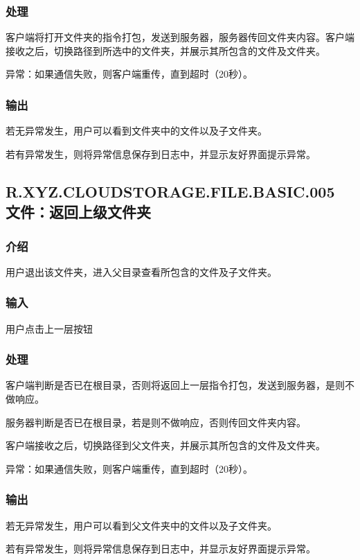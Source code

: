\subsubsection{处理}
客户端将打开文件夹的指令打包，发送到服务器，服务器传回文件夹内容。客户端接收之后，切换路径到所选中的文件夹，并展示其所包含的文件及文件夹。

异常：如果通信失败，则客户端重传，直到超时（20秒）。

\subsubsection{输出}
若无异常发生，用户可以看到文件夹中的文件以及子文件夹。

若有异常发生，则将异常信息保存到日志中，并显示友好界面提示异常。

\subsection{R.XYZ.CLOUDSTORAGE.FILE.BASIC.005 文件：返回上级文件夹}

\subsubsection{介绍}
用户退出该文件夹，进入父目录查看所包含的文件及子文件夹。

\subsubsection{输入}
用户点击上一层按钮

\subsubsection{处理}
客户端判断是否已在根目录，否则将返回上一层指令打包，发送到服务器，是则不做响应。

服务器判断是否已在根目录，若是则不做响应，否则传回文件夹内容。

客户端接收之后，切换路径到父文件夹，并展示其所包含的文件及文件夹。

异常：如果通信失败，则客户端重传，直到超时（20秒）。

\subsubsection{输出}
若无异常发生，用户可以看到父文件夹中的文件以及子文件夹。

若有异常发生，则将异常信息保存到日志中，并显示友好界面提示异常。

